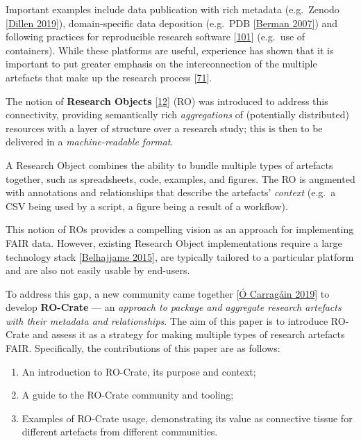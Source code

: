 Important examples include data publication with rich metadata
(e.g.~Zenodo {[}\href{https://doi.org/10.3897/biss.3.37080}{Dillen 2019}{]}),
domain-specific data deposition (e.g.~PDB
{[}\href{https://doi.org/10.1093/nar/gkl971}{Berman 2007}{]}) and following
practices for reproducible research software
{[}\href{https://doi.org/10.1371/journal.pcbi.1003285}{101}{]} (e.g.~use
of containers). While these platforms are useful, experience has shown
that it is important to put greater emphasis on the interconnection of
the multiple artefacts that make up the research process
{[}\href{https://doi.org/10.1016/j.ijhcs.2020.102562}{71}{]}.

The notion of \textbf{Research Objects}
{[}\href{https://www.research.manchester.ac.uk/portal/en/publications/why-linked-data-is-not-enough-for-scientists(479e591e-b295-4478-b0c7-a145c19dcd45).html}{12}{]}
(RO) was introduced to address this connectivity, providing semantically
rich \emph{aggregations} of (potentially distributed) resources with a
layer of structure over a research study; this is then to be delivered
in a \emph{machine-readable format}.

A Research Object combines the ability to bundle multiple types of
artefacts together, such as spreadsheets, code, examples, and figures.
The RO is augmented with annotations and relationships that describe the
artefacts' \emph{context} (e.g.~a CSV being used by a script, a figure
being a result of a workflow).

This notion of ROs provides a compelling vision as an approach for
implementing FAIR data. However, existing Research Object
implementations require a large technology stack
{[}\href{https://doi.org/10.1016/j.websem.2015.01.003}{Belhajjame 2015}{]}, are
typically tailored to a particular platform and are also not easily
usable by end-users.

To address this gap, a new community came together
{[}\href{https://doi.org/10.5281/zenodo.3250687}{Ó Carragáin 2019}{]} to develop
\textbf{RO-Crate} --- an \emph{approach to package and aggregate
research artefacts with their metadata and relationships}. The aim of
this paper is to introduce RO-Crate and assess it as a strategy for
making multiple types of research artefacts FAIR. Specifically, the
contributions of this paper are as follows:

\begin{enumerate}
\def\labelenumi{\arabic{enumi}.}
\tightlist
\item
  An introduction to RO-Crate, its purpose and context;
\item
  A guide to the RO-Crate community and tooling;
\item
  Examples of RO-Crate usage, demonstrating its value as connective
  tissue for different artefacts from different communities.
\end{enumerate}

